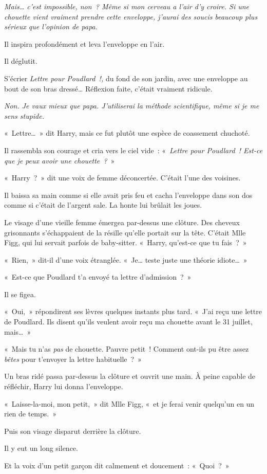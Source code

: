 \emph{Mais\ldots{} c'est impossible, non~? Même si mon cerveau a l'air d'y croire. Si une chouette vient vraiment prendre cette enveloppe, j'aurai des soucis beaucoup plus sérieux que l'opinion de papa.} 

Il inspira profondément et leva l'enveloppe en l'air. 

Il déglutit. 

S'écrier \emph{Lettre pour Poudlard~!,} du fond de son jardin, avec une enveloppe au bout de son bras dressé\ldots{} Réflexion faite, c'était vraiment ridicule. 

\emph{Non. Je vaux mieux que papa. J'utiliserai la méthode scientifique, même si je me sens stupide.} 

«~Lettre\ldots~» dit Harry, mais ce fut plutôt une espèce de coassement chuchoté. 

Il rassembla son courage et cria vers le ciel vide~: «~\emph{Lettre pour Poudlard~! Est-ce que je peux avoir une chouette~?}~» 

«~Harry~?~» dit une voix de femme déconcertée. C'était l'une des voisines. 

Il baissa sa main comme si elle avait pris feu et cacha l'enveloppe dans son dos comme si c'était de l'argent sale. La honte lui brûlait les joues. 

Le visage d'une vieille femme émergea par-dessus une clôture. Des cheveux grisonnants s'échappaient de la résille qu'elle portait sur la tête. C'était Mlle Figg, qui lui servait parfois de baby-sitter. «~Harry, qu'est-ce que tu fais~?~» 

«~Rien,~» dit-il d'une voix étranglée. «~Je\ldots{} teste juste une théorie idiote\ldots~» 

«~Est-ce que Poudlard t'a envoyé ta lettre d'admission~?~» 

Il se figea. 

«~Oui,~» répondirent ses lèvres quelques instants plus tard. «~J'ai reçu une lettre de Poudlard. Ils disent qu'ils veulent avoir reçu ma chouette avant le 31 juillet, mais\ldots~» 

«~Mais tu n'as \emph{pas} de chouette. Pauvre petit~! Comment ont-ils pu être assez \emph{bêtes} pour t'envoyer la lettre habituelle~?~» 

Un bras ridé passa par-dessus la clôture et ouvrit une main. À peine capable de réfléchir, Harry lui donna l'enveloppe. 

«~Laisse-la-moi, mon petit,~» dit Mlle Figg, «~et je ferai venir quelqu'un en un rien de temps.~» 

Puis son visage disparut derrière la clôture. 

Il y eut un long silence. 

Et la voix d'un petit garçon dit calmement et doucement~: «~Quoi~?~»
